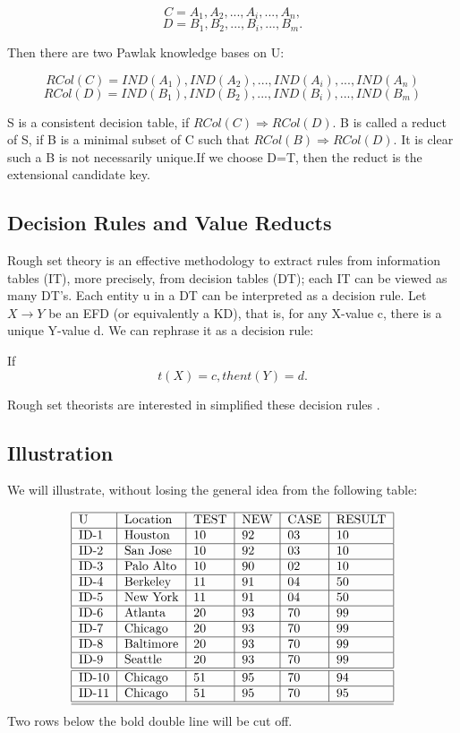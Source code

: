 \documentclass[12pt]{article}
\begin{document}
\[C= {A_{1} , A_{2} ,...,  A_{i} ,...,   A_{n}}, \]
\[D= {B_{1} , B_{2} ,...,  B_{i} ,...,   B_{m}}.\]

Then there are two Pawlak knowledge bases on U:

\[RCol(C)={IND(A_{1}),IND(A_{2}),..., IND(A_{i}),...,  IND(A_{n})} \]
\[RCol(D)={IND(B_{1}),IND(B_{2}),..., IND(B_{i}),...,  IND(B_{m})}\]

S is a consistent decision table, if $RCol(C) \Rightarrow RCol(D)$. B is called a reduct of S, if  B is a minimal subset of C such that $RCol(B) \Rightarrow RCol(D)$. It is clear such a B is not necessarily unique.If we choose D=T, then the reduct is the extensional candidate key.

\subsection{Decision Rules and Value Reducts}
Rough set theory is an effective methodology to extract rules from information tables (IT), more precisely, from decision tables (DT); each IT can be viewed as many DT's. Each entity u in a DT can be interpreted as a decision rule.  Let $X \rightarrow Y$ be an EFD (or equivalently a KD), that is, for any X-value c, there is a unique Y-value d.  We can rephrase it as a decision rule:

If  \[t(X)=c, then t(Y)=d.\]

Rough set theorists are interested in simplified these decision rules \cite{Pawlak91}.

\subsection{Illustration}
We will illustrate, without losing the general idea from the following table:

\[
\begin{tabular}{|l|l|l|l|l|l|}
\hline
U&Location&TEST&NEW&CASE&RESULT\\
  \hline
  ID-1  & Houston   & 10 & 92 & 03 & 10 \\ \hline
  ID-2  & San Jose  & 10 & 92 & 03 & 10 \\ \hline
  ID-3  & Palo Alto & 10 & 90 & 02 & 10 \\ \hline
  ID-4  & Berkeley  & 11 & 91 & 04 & 50 \\ \hline
  ID-5  & New York  & 11 & 91 & 04 & 50 \\ \hline
  ID-6  & Atlanta   & 20 & 93 & 70 & 99 \\ \hline
  ID-7  & Chicago   & 20 & 93 & 70 & 99 \\ \hline
  ID-8  & Baltimore & 20 & 93 & 70 & 99 \\ \hline
  ID-9  & Seattle   & 20 & 93 & 70 & 99 \\ \hline \hline
  ID-10 & Chicago  & 51 & 95 & 70 & 94 \\ \hline
  ID-11 & Chicago  & 51 & 95 & 70 & 95 \\ \hline
  \hline
\end{tabular} 
\]
Two rows below the bold double line will be cut off.
\end{document}
